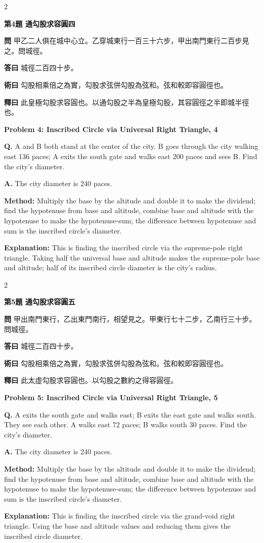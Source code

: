\documentclass[11pt,a4paper]{article}
\newcommand{\wen}[1]{\noindent\textbf{問} #1\par\smallskip}
\newcommand{\da}[1]{\noindent\textbf{答曰} #1\par\smallskip}
\newcommand{\shu}[1]{\noindent\textbf{術曰} #1\par\smallskip}
\newcommand{\shi}[1]{\noindent\textbf{釋曰} #1\par\smallskip}
\newcommand{\wenE}[1]{\noindent\textbf{Q.} #1\par\smallskip}
\newcommand{\daE}[1]{\noindent\textbf{A.} #1\par\smallskip}
\newcommand{\shuE}[1]{\noindent\textbf{Method:} #1\par\smallskip}
\newcommand{\shiE}[1]{\noindent\textbf{Explanation:} #1\par\smallskip}
\begin{document}
\bigskip

\begin{paracol}{2}

\noindent\textbf{第4題 通勾股求容圓四}

\wen{甲乙二人俱在城中心立。乙穿城東行一百三十六步，甲出南門東行二百步見之。問城徑。}
\da{城徑二百四十步。}
\shu{勾股相乘倍之為實，勾股求弦併勾股為弦和。弦和較即容圓徑也。}
\shi{此皇極勾股求容圓也。以通勾股之半為皇極勾股，其容圓徑之半即城半徑也。}

\switchcolumn

\noindent\textbf{Problem 4: Inscribed Circle via Universal Right Triangle, 4}

\wenE{A and B both stand at the center of the city. B goes through the city walking east 136 paces; A exits the south gate and walks east 200 paces and sees B. Find the city's diameter.}
\daE{The city diameter is 240 paces.}
\shuE{Multiply the base by the altitude and double it to make the dividend; find the hypotenuse from base and altitude, combine base and altitude with the hypotenuse to make the hypotenuse-sum; the difference between hypotenuse and sum is the inscribed circle's diameter.}
\shiE{This is finding the inscribed circle via the supreme-pole right triangle. Taking half the universal base and altitude makes the supreme-pole base and altitude; half of its inscribed circle diameter is the city's radius.}

\end{paracol}

\bigskip

\begin{paracol}{2}

\noindent\textbf{第5題 通勾股求容圓五}

\wen{甲出南門東行，乙出東門南行，相望見之。甲東行七十二步，乙南行三十步。問城徑。}
\da{城徑二百四十步。}
\shu{勾股相乘倍之為實，勾股求弦併勾股為弦和。弦和較即容圓徑也。}
\shi{此太虛勾股求容圓也。以勾股之數約之得容圓徑。}

\switchcolumn

\noindent\textbf{Problem 5: Inscribed Circle via Universal Right Triangle, 5}

\wenE{A exits the south gate and walks east; B exits the east gate and walks south. They see each other. A walks east 72 paces; B walks south 30 paces. Find the city's diameter.}
\daE{The city diameter is 240 paces.}
\shuE{Multiply the base by the altitude and double it to make the dividend; find the hypotenuse from base and altitude, combine base and altitude with the hypotenuse to make the hypotenuse-sum; the difference between hypotenuse and sum is the inscribed circle's diameter.}
\shiE{This is finding the inscribed circle via the grand-void right triangle. Using the base and altitude values and reducing them gives the inscribed circle diameter.}

\end{paracol}
\end{document}
